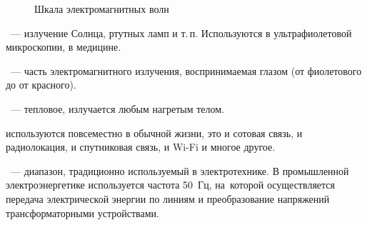 \begin{figure}[!h]
    \caption{Шкала электромагнитных волн}
\end{figure}
~--- излучение Солнца, ртутных ламп и т.\,п. Используются в ультрафиолетовой микроскопии, в медицине.

~--- часть электромагнитного излучения, воспринимаемая глазом (от фиолетового до от красного).

~--- тепловое, излучается любым нагретым телом.

 используются повсеместно в обычной жизни, это и сотовая связь, и радиолокация, и спутниковая связь, и Wi-Fi и многое другое.

~--- диапазон, традиционно используемый в электротехнике. В промышленной электроэнергетике используется частота 50~Гц, на~которой осуществляется передача электрической энергии по линиям и преобразование напряжений трансформаторными устройствами.
